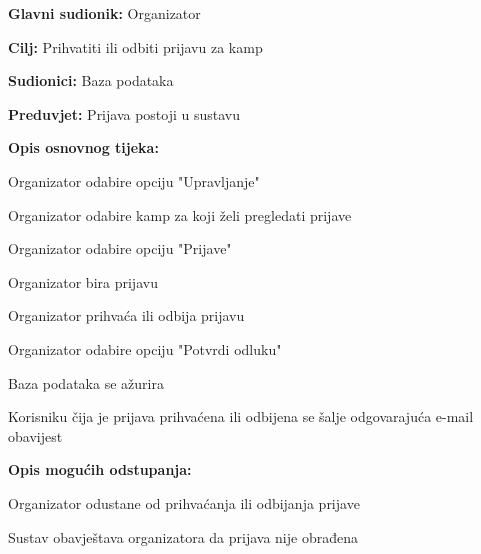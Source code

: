 					\noindent {}
					\begin{packed_item}
						
						\item \textbf{Glavni sudionik: } Organizator
						\item  \textbf{Cilj:} Prihvatiti ili odbiti prijavu za kamp
						\item  \textbf{Sudionici:} Baza podataka
						\item  \textbf{Preduvjet:} Prijava postoji u sustavu
						\item  \textbf{Opis osnovnog tijeka:}
						
						\item[] \begin{packed_enum}
							
							\item Organizator odabire opciju "Upravljanje"
							\item Organizator odabire kamp za koji želi pregledati prijave
							\item Organizator odabire opciju "Prijave"
							\item Organizator bira prijavu
							\item Organizator prihvaća ili odbija prijavu
							\item Organizator odabire opciju "Potvrdi odluku"
							\item Baza podataka se ažurira
							\item Korisniku čija je prijava prihvaćena ili odbijena se šalje odgovarajuća e-mail obavijest
						\end{packed_enum}
						
						\item  \textbf{Opis mogućih odstupanja:}
						
						\item[] \begin{packed_item}
							
							\item[5.a] Organizator odustane od prihvaćanja ili odbijanja prijave
							\item[] \begin{packed_enum}
								
								\item Sustav obavještava organizatora da prijava nije obrađena
								
							\end{packed_enum}												
						\end{packed_item}
					\end{packed_item}
				
